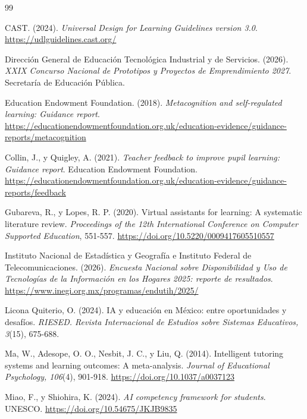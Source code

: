 \documentclass[letterpaper,11pt]{article}
\begin{document}
\clearpage

\begin{thebibliography}{99}
\setlength{\itemsep}{4pt}

CAST. (2024). \textit{Universal Design for Learning Guidelines version 3.0}. \url{https://udlguidelines.cast.org/}

Dirección General de Educación Tecnológica Industrial y de Servicios. (2026). \textit{XXIX Concurso Nacional de Prototipos y Proyectos de Emprendimiento 2027}. Secretaría de Educación Pública.

Education Endowment Foundation. (2018). \textit{Metacognition and self-regulated learning: Guidance report}. \url{https://educationendowmentfoundation.org.uk/education-evidence/guidance-reports/metacognition}

Collin, J., y Quigley, A. (2021). \textit{Teacher feedback to improve pupil learning: Guidance report}. Education Endowment Foundation. \url{https://educationendowmentfoundation.org.uk/education-evidence/guidance-reports/feedback}

Gubareva, R., y Lopes, R. P. (2020). Virtual assistants for learning: A systematic literature review. \textit{Proceedings of the 12th International Conference on Computer Supported Education}, 551-557. \url{https://doi.org/10.5220/0009417605510557}

Instituto Nacional de Estadística y Geografía e Instituto Federal de Telecomunicaciones. (2026). \textit{Encuesta Nacional sobre Disponibilidad y Uso de Tecnologías de la Información en los Hogares 2025: reporte de resultados}. \url{https://www.inegi.org.mx/programas/endutih/2025/}

Licona Quiterio, O. (2024). IA y educación en México: entre oportunidades y desafíos. \textit{RIESED. Revista Internacional de Estudios sobre Sistemas Educativos, 3}(15), 675-688.

Ma, W., Adesope, O. O., Nesbit, J. C., y Liu, Q. (2014). Intelligent tutoring systems and learning outcomes: A meta-analysis. \textit{Journal of Educational Psychology, 106}(4), 901-918. \url{https://doi.org/10.1037/a0037123}

Miao, F., y Shiohira, K. (2024). \textit{AI competency framework for students}. UNESCO. \url{https://doi.org/10.54675/JKJB9835}


\end{thebibliography}
\end{document}
